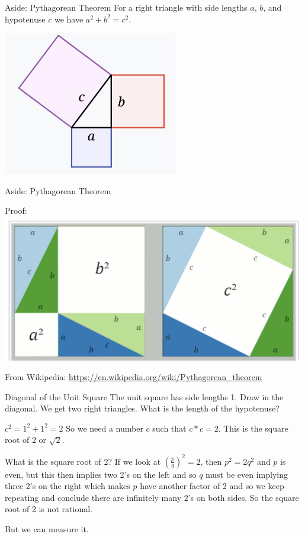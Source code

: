 \documentclass{beamer}
\begin{document}
\begin{frame}{Aside: Pythagorean Theorem}
    For a right triangle with side lengths $a$, $b$, and hypotenuse $c$ we have $a^2 + b^2 = c^2$.

    \includegraphics[width=3in]{Images/pythagoras.png}

\end{frame}

\begin{frame}{Aside: Pythagorean Theorem}

    Proof:  \includegraphics[width=\textwidth]{Images/pythagoras-proof.png}

    From Wikipedia: \url{https://en.wikipedia.org/wiki/Pythagorean_theorem}
    
\end{frame}

\begin{frame}{Diagonal of the Unit Square}
    The unit square has side lengths 1. Draw in the diagonal. We get two right triangles. What is the length of the hypotenuse? 

    $c^2 = 1^2 + 1^2 = 2$  So we need a number $c$ such that $c*c = 2$. This is the square root of 2 or $\sqrt{2}$.

    What is the square root of 2?  If we look at $(\frac{p}{q})^2 = 2$, then $p^2 = 2q^2$ and $p$ is even, but this then implies two 2's on the left and so $q$ must be even implying three 2's on the right which makes $p$ have another factor of 2 and so we keep repeating and conclude there are infinitely many 2's on both sides. So the square root of 2 is not rational. 

    But we can measure it.
    
\end{frame}
\end{document}
